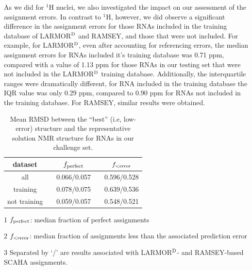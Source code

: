 \documentclass[journal=jcisd8,manuscript=article,layout=onecolumn]{achemso}
\begin{document}
As we did for $^{1}$H nuclei, we also investigated the impact on our assessment of the assignment errors. In contrast to $^{1}$H, however, we did observe a significant difference in the assignment errors for those RNAs included in the training database of LARMOR$^{\rm D}$ and RAMSEY, and those that were not included. For example, for LARMOR$^{\rm D}$, even after accounting for referencing errors, the median assignment errors for RNAs included it's training database was 0.71 ppm, compared with a value of 1.13 ppm for those RNAs in our testing set that were not included in the LARMOR$^{\rm D}$ training database.  Additionally, the interquartile ranges were dramatically different, for RNA included in the training database the IQR value was only 0.29 ppm, compared to 0.90 ppm for RNAs not included in the training database. For RAMSEY, similar results were obtained.

\begin{table}[h!]
\centering
\caption{Mean RMSD between the ``best'' (i.e, low-error) structure and the representative solution NMR structure for RNAs in our challenge set.}
\begin{threeparttable}
\begin{tabular}{*5c}
\hline
dataset & {} & $f_{\rm perfect}$ & {} & $f_{\rm < error}$ \\
\hline
all & {}           & 0.066/0.057 & {} & 0.596/0.528 \\
training & {}      & 0.078/0.075 & {} & 0.639/0.536 \\
not training & {}  & 0.059/0.057 & {} & 0.548/0.521 \\
\hline
\end{tabular}
\begin{tablenotes}
\item[1]  $f_{\rm perfect}$: median fraction of perfect assignments
\item[2] $f_{\rm < error}$: median fraction of assignments less than the associated prediction error
\item[3] Separated by `/' are  results associated with LARMOR$^{\rm D}$- and RAMSEY-based SCAHA assignments.
\end{tablenotes}
\end{threeparttable}
\label{tab:fractions} 
\end{table}
\end{document}
